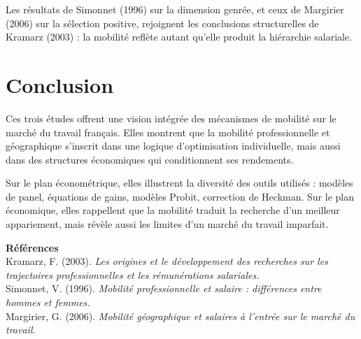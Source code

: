\documentclass[12pt,a4paper]{article}
\begin{document}
Les résultats de Simonnet (1996) sur la dimension genrée, et ceux de Margirier (2006) sur la sélection positive, rejoignent les conclusions structurelles de Kramarz (2003) : la mobilité reflète autant qu’elle produit la hiérarchie salariale.

\section*{Conclusion}

Ces trois études offrent une vision intégrée des mécanismes de mobilité sur le marché du travail français.  
Elles montrent que la mobilité professionnelle et géographique s’inscrit dans une logique d’optimisation individuelle, mais aussi dans des structures économiques qui conditionnent ses rendements.  

Sur le plan économétrique, elles illustrent la diversité des outils utilisés : modèles de panel, équations de gains, modèles Probit, correction de Heckman.  
Sur le plan économique, elles rappellent que la mobilité traduit la recherche d’un meilleur appariement, mais révèle aussi les limites d’un marché du travail imparfait.

\vspace{1em}
\noindent\textbf{Références} \\
Kramarz, F. (2003). \textit{Les origines et le développement des recherches sur les trajectoires professionnelles et les rémunérations salariales.} \\
Simonnet, V. (1996). \textit{Mobilité professionnelle et salaire : différences entre hommes et femmes.} \\
Margirier, G. (2006). \textit{Mobilité géographique et salaires à l’entrée sur le marché du travail.}
\end{document}
